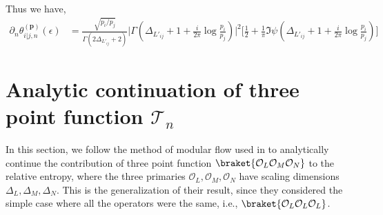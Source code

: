 \documentclass[11pt]{article}
\newcommand{\ep}{\epsilon}
\newcommand{\p}{\partial}
\newcommand{\mO}{\mathcal{O}}
\newcommand{\lb}{\left(}
\newcommand{\rb}{\right)}
\begin{document}
Thus we have,
\begin{align}
    \p_n\theta_{i|j,n}^{(\textbf{p})}(\ep) &= \frac{\sqrt{p_i/p_j}}{\Gamma(2\Delta_{L'_{ij}} +2)} \Bigg|\Gamma\lb \Delta_{L'_{ij}} + 1 +\frac{i }{2\pi}\log \frac{p_i }{p_j}\rb\Bigg|^2\Bigg[\frac{1}{2}+ \frac{1}{\pi} \Im \psi\lb\Delta_{L'_{ij}}+ 1 + \frac{i }{2\pi}\log \frac{p_i }{p_j}\rb\Bigg]
\end{align}

\section{\texorpdfstring{Analytic continuation of three point function $\mathcal{T}_n$}{Analytic continuation of three point function tau}}
In this section, we follow the method of modular flow used in \cite{S_rosi_2018} to analytically continue the contribution of three point function $\braket{\mO_L \mO_M \mO_N}$ to the relative entropy, where the three primaries $\mO_L,\mO_M, \mO_N$ have scaling dimensions $\Delta_L,\Delta_M,\Delta_N$. This is the generalization of their result, since they considered the simple case where all the operators were the same, i.e., $\braket{\mO_L \mO_L \mO_L}$. 
\end{document}
